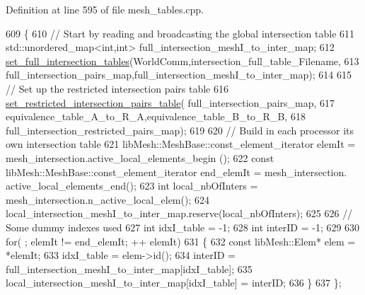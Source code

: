 Definition at line 595 of file mesh\+\_\+tables.\+cpp.


\begin{DoxyCode}
609 \{
610     \textcolor{comment}{//  Start by reading and broadcasting the global intersection table}
611     std::unordered\_map<int,int> full\_intersection\_meshI\_to\_inter\_map;
612     \hyperlink{namespacecarl_a0fef8616ca5e61709ef9a013c8a2ee43}{set\_full\_intersection\_tables}(WorldComm,intersection\_full\_table\_Filename,
613             full\_intersection\_pairs\_map,full\_intersection\_meshI\_to\_inter\_map);
614 
615     \textcolor{comment}{// Set up the restricted intersection pairs table}
616     \hyperlink{namespacecarl_a17eb70b3f2c2574e7b3085108205e38c}{set\_restricted\_intersection\_pairs\_table}(
      full\_intersection\_pairs\_map,
617         equivalence\_table\_A\_to\_R\_A,equivalence\_table\_B\_to\_R\_B,
618         full\_intersection\_restricted\_pairs\_map);
619 
620     \textcolor{comment}{// Build in each processor its own intersection table}
621     libMesh::MeshBase::const\_element\_iterator       elemIt  = mesh\_intersection.active\_local\_elements\_begin
      ();
622     \textcolor{keyword}{const} libMesh::MeshBase::const\_element\_iterator end\_elemIt = mesh\_intersection.
      active\_local\_elements\_end();
623     \textcolor{keywordtype}{int} local\_nbOfInters = mesh\_intersection.n\_active\_local\_elem();
624     local\_intersection\_meshI\_to\_inter\_map.reserve(local\_nbOfInters);
625 
626     \textcolor{comment}{// Some dummy indexes used}
627     \textcolor{keywordtype}{int} idxI\_table = -1;
628     \textcolor{keywordtype}{int} interID = -1;
629 
630     \textcolor{keywordflow}{for}( ; elemIt != end\_elemIt; ++ elemIt)
631     \{
632         \textcolor{keyword}{const} libMesh::Elem* elem = *elemIt;
633         idxI\_table  = elem->id();
634         interID     = full\_intersection\_meshI\_to\_inter\_map[idxI\_table];
635         local\_intersection\_meshI\_to\_inter\_map[idxI\_table] = interID;
636     \}
637 \};
\end{DoxyCode}
\hypertarget{namespacecarl_a8d1c90daac3238ed5d53465740e072b3}{}
